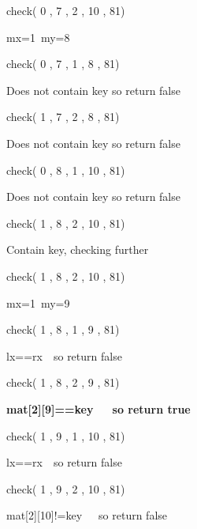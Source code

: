 \documentclass[14pt]{article}
\renewcommand{\_}{\kern-1.5pt\textunderscore\kern-1.5pt}
\begin{document}
\begin{multicols}{2}
\begin{enumerate}
\vspace{\baselineskip}
\begin{justify}
check( 0 , 7 , 2 , 10 , 81) 
\end{justify}
\begin{justify}
mx=1\  my=8
\end{justify}
\begin{justify}
check( 0 , 7 , 1 , 8 , 81) 
\end{justify}
\begin{justify}
Does not contain key so return false
\end{justify}
\begin{justify}
check( 1 , 7 , 2 , 8 , 81) 
\end{justify}
\begin{justify}
Does not contain key so return false
\end{justify}
\begin{justify}
check( 0 , 8 , 1 , 10 , 81) 
\end{justify}
\begin{justify}
Does not contain key so return false
\end{justify}
\begin{justify}
check( 1 , 8 , 2 , 10 , 81)
\end{justify}
\begin{justify}
Contain key, checking further
\end{justify}

\vspace{\baselineskip}
\begin{justify}
check( 1 , 8 , 2 , 10 , 81)
\end{justify}
\begin{justify}
mx=1\  my=9
\end{justify}
\begin{justify}
check( 1 , 8 , 1 , 9 , 81) 
\end{justify}
\begin{justify}
lx==rx\ \  so return false
\end{justify}
\begin{justify}
check( 1 , 8 , 2 , 9 , 81) 
\end{justify}
\begin{justify}
\textbf{mat[2][9]==key\ \ \  so return true}
\end{justify}
\begin{justify}
check( 1 , 9 , 1 , 10 , 81) 
\end{justify}
\begin{justify}
lx==rx\ \  so return false
\end{justify}
\begin{justify}
check( 1 , 9 , 2 , 10 , 81)
\end{justify}
\begin{justify}
mat[2][10]!=key\ \ \  so return false
\end{justify}


\end{enumerate}
\end{multicols}
\end{document}
